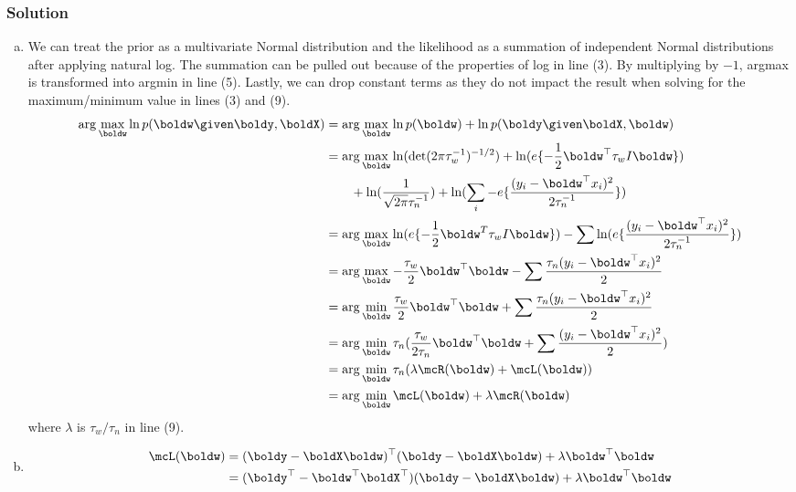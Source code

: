 \documentclass[submit]{harvardml}
\begin{document}
\subsubsection*{Solution}
\begin{enumerate}[(a)]
    \item We can treat the prior as a multivariate Normal distribution and the likelihood as a summation of independent Normal distributions after applying natural log. The summation can be pulled out because of the properties of log in line (3). By multiplying by $-1$, argmax is transformed into argmin in line (5). Lastly, we can drop constant terms as they do not impact the result when solving for the maximum/minimum value in lines (3) and (9). 
    \begin{align}
    \arg\max_{\boldw} \ln p(\boldw \given \boldy, \boldX) &= \arg\max_{\boldw} \ln p(\boldw) + \ln p(\boldy \given \boldX, \boldw) \\
    &= \arg\max_{\boldw} \ln (\det(2\pi \tau_w^{-1})^{-1/2}) + \ln (e \{-\frac{1}{2} \boldw^\top \tau_w I \boldw \})\\ \nonumber
    & \qquad + \ln (\frac{1}{\sqrt{2\pi} \tau_n^{-1}}) + \ln (\sum_i - e \{\frac{(y_i - \boldw^\top x_i)^2}{2\tau_n^{-1}}\}) \\ 
    &= \arg\max_{\boldw} \ln (e \{-\frac{1}{2} \boldw^T \tau_w I \boldw \})- \sum \ln ( e \{\frac{(y_i - \boldw^\top x_i)^2}{2\tau_n^{-1}}\}) \\
    &= \arg\max_{\boldw} -\frac{\tau_w}{2} \boldw^\top \boldw - \sum \frac{\tau_n(y_i - \boldw^\top x_i)^2}{2}\\
    &= \arg\min_{\boldw} \frac{\tau_w}{2} \boldw^\top \boldw + \sum \frac{\tau_n(y_i - \boldw^\top x_i)^2}{2}\\
    &= \arg\min_{\boldw} \tau_n( \frac{\tau_w}{2\tau_n} \boldw^\top \boldw + \sum \frac{(y_i - \boldw^\top x_i)^2}{2})\\
    &= \arg\min_{\boldw} \tau_n(\lambda \mcR(\boldw)+ \mcL(\boldw))\\
    &= \arg\min_{\boldw}\mcL(\boldw) + \lambda \mcR(\boldw)
    \end{align}
    where $\lambda$ is $\tau_w/\tau_n$ in line (9).
    \item 
    \begin{align*}
        \mcL(\boldw) &= (\boldy - \boldX \boldw)^\top (\boldy - \boldX \boldw) + \lambda \boldw^\top \boldw \\
        &= (\boldy^\top - \boldw^\top\boldX^\top ) (\boldy - \boldX \boldw) + \lambda \boldw^\top \boldw \\

\end{align*}
\end{enumerate}
\end{document}
